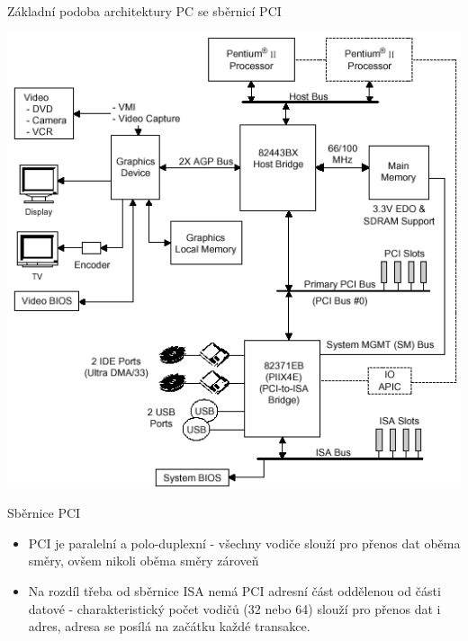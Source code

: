\documentclass[aspectratio=43]{beamer}
\begin{document}
\begin{frame}{Základní podoba architektury PC se sběrnicí PCI}
    \begin{center}
        \includegraphics[width=0.7\linewidth]{extrahovane_obrazky/img_1_page10_0.png}
    \end{center}
\end{frame}



\begin{frame}{Sběrnice  PCI}
	\begin{itemize}
		\item PCI je paralelní a polo-duplexní - všechny vodiče slouží pro přenos dat oběma směry, ovšem nikoli oběma směry zároveň
		\item Na rozdíl třeba od sběrnice ISA nemá PCI adresní část oddělenou od části datové - charakteristický počet vodičů (32 nebo 64) slouží pro přenos dat i adres, adresa se posílá na začátku každé transakce.
	\end{itemize}
	
\end{frame}
\end{document}
